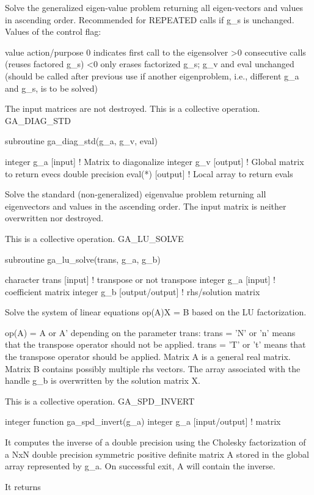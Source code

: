 Solve the generalized eigen-value problem returning all eigen-vectors
and values in ascending order. Recommended for REPEATED calls if g\_s
is unchanged. Values of the control flag:

value action/purpose 0 indicates first call to the eigensolver >0
consecutive calls (reuses factored g\_s) <0 only erases factorized
g\_s; g\_v and eval unchanged (should be called after previous use
if another eigenproblem, i.e., different g\_a and g\_s, is to be solved)

The input matrices are not destroyed. This is a collective operation.
GA\_DIAG\_STD

subroutine ga\_diag\_std(g\_a, g\_v, eval)

integer g\_a {[}input{]} ! Matrix to diagonalize integer g\_v {[}output{]}
! Global matrix to return evecs double precision eval({*}) {[}output{]}
! Local array to return evals

Solve the standard (non-generalized) eigenvalue problem returning
all eigenvectors and values in the ascending order. The input matrix
is neither overwritten nor destroyed.

This is a collective operation. GA\_LU\_SOLVE

subroutine ga\_lu\_solve(trans, g\_a, g\_b)

character trans {[}input{]} ! transpose or not transpose integer g\_a
{[}input{]} ! coefficient matrix integer g\_b {[}output/output{]}
! rhs/solution matrix

Solve the system of linear equations op(A)X = B based on the LU factorization.

op(A) = A or A' depending on the parameter trans: trans = 'N' or 'n'
means that the transpose operator should not be applied. trans = 'T'
or 't' means that the transpose operator should be applied. Matrix
A is a general real matrix. Matrix B contains possibly multiple rhs
vectors. The array associated with the handle g\_b is overwritten
by the solution matrix X.

This is a collective operation. GA\_SPD\_INVERT

integer function ga\_spd\_invert(g\_a) integer g\_a {[}input/output{]}
! matrix

It computes the inverse of a double precision using the Cholesky factorization
of a NxN double precision symmetric positive definite matrix A stored
in the global array represented by g\_a. On successful exit, A will
contain the inverse.

It returns

